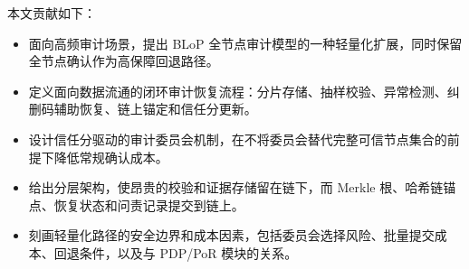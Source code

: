 本文贡献如下：

\begin{itemize}
  \item 面向高频审计场景，提出 BLoP 全节点审计模型的一种轻量化扩展，同时保留全节点确认作为高保障回退路径。
  \item 定义面向数据流通的闭环审计恢复流程：分片存储、抽样校验、异常检测、纠删码辅助恢复、链上锚定和信任分更新。
  \item 设计信任分驱动的审计委员会机制，在不将委员会替代完整可信节点集合的前提下降低常规确认成本。
  \item 给出分层架构，使昂贵的校验和证据存储留在链下，而 Merkle 根、哈希链锚点、恢复状态和问责记录提交到链上。
  \item 刻画轻量化路径的安全边界和成本因素，包括委员会选择风险、批量提交成本、回退条件，以及与 PDP/PoR 模块的关系。
\end{itemize}

